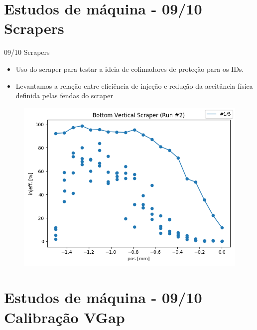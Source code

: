 \documentclass{beamer}					  %
\begin{document}
\section{Estudos de máquina - 09/10 Scrapers}

\begin{frame}{09/10 Scrapers}
    \begin{itemize}
		\item Uso do scraper para testar a ideia de colimadores de proteção para os IDs. 
        \item Levantamos a relação entre eficiência de injeção e redução da aceitância física definida pelas fendas do scraper
	\end{itemize}
    \begin{figure}[H]
		\centering
        \includegraphics[width=.7\textwidth]{2023-10-27/figures/injeff-vs-vscrap.png}
        \label{fig:vgap}
    \end{figure}
\end{frame}



\section{Estudos de máquina - 09/10 Calibração VGap}
\end{document}
